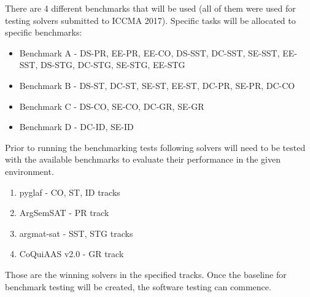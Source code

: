 There are 4 different benchmarks that will be used  (all of them were used for testing solvers submitted to ICCMA 2017). Specific tasks will be allocated to specific benchmarks:
\begin{itemize}
	\item{Benchmark A - DS-PR, EE-PR, EE-CO, DS-SST, DC-SST, SE-SST, EE-SST, DS-STG, DC-STG, SE-STG, EE-STG}
	\item{Benchmark B - DS-ST, DC-ST, SE-ST, EE-ST, DC-PR, SE-PR, DC-CO}
	\item{Benchmark C - DS-CO, SE-CO, DC-GR, SE-GR}
	\item{Benchmark D - DC-ID, SE-ID}
\end{itemize}

Prior to running the benchmarking tests following solvers will need to be tested with the available benchmarks to evaluate their performance in the given environment.
\begin{enumerate}
	\item{pyglaf - CO, ST, ID tracks}
	\item{ArgSemSAT - PR track}
	\item{argmat-sat - SST, STG tracks}
	\item{CoQuiAAS v2.0 - GR track}
\end{enumerate}
Those are the winning solvers in the specified tracks. Once the baseline for benchmark testing will be created, the software testing can commence.